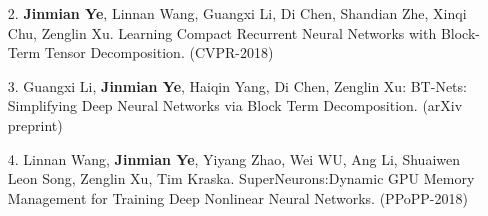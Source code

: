 \documentclass{res}
\begin{document}
\begin{resume}
\begin{itemize}
    \item[2.] \textbf{Jinmian Ye}, Linnan Wang, Guangxi Li, Di Chen, Shandian Zhe, Xinqi Chu, Zenglin Xu. Learning Compact Recurrent Neural Networks with Block-Term Tensor Decomposition. (CVPR-2018)
    
    \item[3.] Guangxi Li, \textbf{Jinmian Ye}, Haiqin Yang, Di Chen, Zenglin Xu: BT-Nets: Simplifying Deep Neural Networks via Block Term Decomposition. (arXiv preprint)
    
    \item[4.] Linnan Wang, \textbf{Jinmian Ye}, Yiyang Zhao, Wei WU, Ang Li, Shuaiwen Leon Song, Zenglin Xu, Tim Kraska. SuperNeurons:Dynamic GPU Memory Management for Training Deep Nonlinear Neural Networks. (PPoPP-2018)

    

\end{itemize}
\end{resume}
\end{document}
